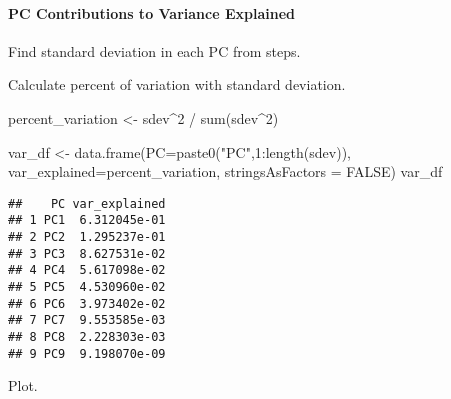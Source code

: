 \documentclass[
]{article}
\newenvironment{Shaded}{\begin{snugshade}}{\end{snugshade}}
\newcommand{\AttributeTok}[1]{\textcolor[rgb]{0.77,0.63,0.00}{#1}}
\newcommand{\ConstantTok}[1]{\textcolor[rgb]{0.00,0.00,0.00}{#1}}
\newcommand{\DecValTok}[1]{\textcolor[rgb]{0.00,0.00,0.81}{#1}}
\newcommand{\FunctionTok}[1]{\textcolor[rgb]{0.00,0.00,0.00}{#1}}
\newcommand{\NormalTok}[1]{#1}
\newcommand{\OtherTok}[1]{\textcolor[rgb]{0.56,0.35,0.01}{#1}}
\newcommand{\SpecialCharTok}[1]{\textcolor[rgb]{0.00,0.00,0.00}{#1}}
\newcommand{\StringTok}[1]{\textcolor[rgb]{0.31,0.60,0.02}{#1}}
\begin{document}
\hypertarget{pc-contributions-to-variance-explained}{%
\paragraph{PC Contributions to Variance
Explained}\label{pc-contributions-to-variance-explained}}

Find standard deviation in each PC from steps.

\begin{Shaded}
\end{Shaded}

Calculate percent of variation with standard deviation.

\begin{Shaded}
\begin{Highlighting}[]
\NormalTok{percent\_variation }\OtherTok{\textless{}{-}}\NormalTok{ sdev}\SpecialCharTok{\^{}}\DecValTok{2} \SpecialCharTok{/} \FunctionTok{sum}\NormalTok{(sdev}\SpecialCharTok{\^{}}\DecValTok{2}\NormalTok{)}
\end{Highlighting}
\end{Shaded}

\begin{Shaded}
\begin{Highlighting}[]
\NormalTok{var\_df }\OtherTok{\textless{}{-}} \FunctionTok{data.frame}\NormalTok{(}\AttributeTok{PC=}\FunctionTok{paste0}\NormalTok{(}\StringTok{"PC"}\NormalTok{,}\DecValTok{1}\SpecialCharTok{:}\FunctionTok{length}\NormalTok{(sdev)),}
                     \AttributeTok{var\_explained=}\NormalTok{percent\_variation,}
                     \AttributeTok{stringsAsFactors =} \ConstantTok{FALSE}\NormalTok{)}
\NormalTok{var\_df}
\end{Highlighting}
\end{Shaded}

\begin{verbatim}
##    PC var_explained
## 1 PC1  6.312045e-01
## 2 PC2  1.295237e-01
## 3 PC3  8.627531e-02
## 4 PC4  5.617098e-02
## 5 PC5  4.530960e-02
## 6 PC6  3.973402e-02
## 7 PC7  9.553585e-03
## 8 PC8  2.228303e-03
## 9 PC9  9.198070e-09
\end{verbatim}

Plot.
\end{document}
